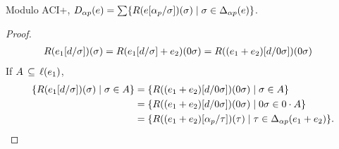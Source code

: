 \documentclass{article}
\newcommand\repname{R}
\newcommand\rep[2]{\repname(#2)(#1)}
\newcommand\STD{\Delta}
\begin{document}
\begin{lemma}
\label{eq:ABDelta}
Modulo ACI+, $D_{\alpha p}(e) = \sum\set{\rep\sigma{e\subst{\alpha_p}\sigma}}{\sigma\in\STD_{\alpha p}(e)}$.
\end{lemma}
\begin{proof}
\begin{align*}
\rep\sigma{e_1\subst{d}\sigma}
&= \rep{0\sigma}{e_1\subst{d}\sigma+e_2} = \rep{0\sigma}{(e_1+e_2)\subst{d}{0\sigma}}
\end{align*}
If $A\,\subseteq\,\ell(e_1)$,
\begin{align*}
\set{\rep\sigma{e_1\subst{d}\sigma}}{\sigma\in A}
&= \set{\rep{0\sigma}{(e_1+e_2)\subst{d}{0\sigma}}}{\sigma\in A}\\
&= \set{\rep{0\sigma}{(e_1+e_2)\subst{d}{0\sigma}}}{0\sigma\in 0\cdot A}\\
&= \set{\rep{\tau}{(e_1+e_2)\subst{\alpha_p}{\tau}}}{\tau\in\STD_{\alpha p}(e_1+e_2)}.
\end{align*}


\end{proof}
\end{document}
